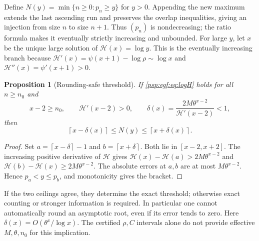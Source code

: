 \documentclass[11pt,letterpaper]{article}
\numberwithin{equation}{section}
\newtheorem{proposition}[theorem]{Proposition}
\theoremstyle{remark}\newtheorem{remark}[theorem]{Remark}
\newcommand{\ceil}[1]{\left\lceil#1\right\rceil}
\begin{document}
Define $N(y)=\min\{n\geq0:p_n\geq y\}$ for $y>0$. Appending the new
maximum extends the last ascending run and preserves the overlap
inequalities, giving an injection from size $n$ to size $n+1$.
Thus $(p_n)$ is nondecreasing; the ratio formula makes it eventually
strictly increasing and unbounded. For large $y$, let $x$ be the unique
large solution of $\mathcal H(x)=\log y$. This is the eventually
increasing branch because
$\mathcal H'(x)=\psi(x+1)-\log\rho\sim\log x$ and
$\mathcal H''(x)=\psi'(x+1)>0$.

\begin{proposition}[Rounding-safe threshold]\label{psp:egf:prop:ceil}
If \eqref{psp:egf:eq:logH} holds for all $n\geq n_0$ and
\[
 x-2\geq n_0,\qquad \mathcal H'(x-2)>0,\qquad
 \delta(x)=\frac{2M\theta^{x-2}}{\mathcal H'(x-2)}<1,
\]
then
\begin{equation}\label{psp:egf:eq:ceil}
 \ceil{x-\delta(x)}\leq N(y)\leq\ceil{x+\delta(x)}.
\end{equation}
\end{proposition}
\begin{proof}
Set $a=\ceil{x-\delta}-1$ and $b=\ceil{x+\delta}$. Both lie in
$[x-2,x+2]$. The increasing positive derivative of $\mathcal H$ gives
$\mathcal H(x)-\mathcal H(a)>2M\theta^{x-2}$ and
$\mathcal H(b)-\mathcal H(x)\geq2M\theta^{x-2}$.
The absolute errors at $a,b$ are at most $M\theta^{x-2}$.
Hence $p_a<y\leq p_b$, and monotonicity gives the bracket.
\end{proof}
If the two ceilings agree, they determine the exact threshold; otherwise
exact counting or stronger information is required. In particular one
cannot automatically round an asymptotic root, even if its error tends
to zero. Here $\delta(x)=O(\theta^x/\log x)$.
The certified $\rho,C$ intervals alone do not provide effective
$M,\theta,n_0$ for this implication.
\end{document}
